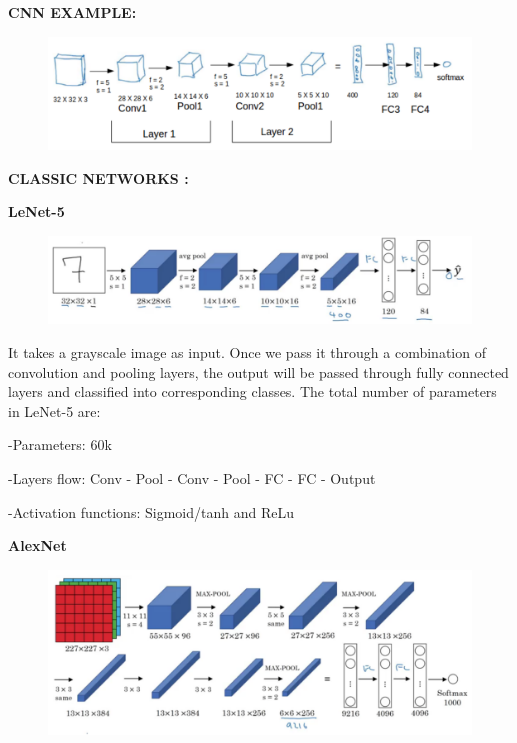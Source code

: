\documentclass[a4paper]{article}
\begin{document}
\clearpage

\textbf{CNN EXAMPLE:} 

{
\begin{figure}[htp]
    \centering
    \includegraphics[width=15cm]{CNN_eg.png}
\end{figure}
}

\textbf{CLASSIC  NETWORKS :} 

\textbf{LeNet-5}
{
\begin{figure}[htp]
    \centering
    \includegraphics[width=15cm]{LeNet5.png}
\end{figure}
}

It takes a grayscale image as input. Once we pass it through a combination of convolution and pooling layers, the output will be passed through fully connected layers and classified into corresponding classes. The total number of parameters in LeNet-5 are: 

    -Parameters: 60k
    
    -Layers flow: Conv - Pool - Conv - Pool - FC - FC - Output
    
    -Activation functions: Sigmoid/tanh and ReLu
    
\textbf{ AlexNet  } 

{
\begin{figure}[htp]
    \centering
    \includegraphics[width=15cm]{AlexNet.png}
\end{figure}
}
\end{document}
